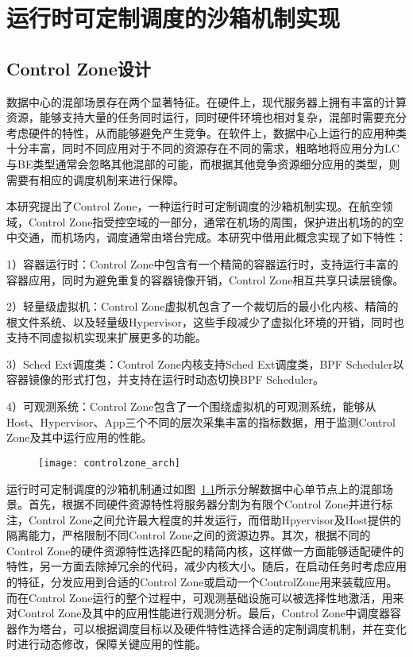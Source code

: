 \chapter{运行时可定制调度的沙箱机制实现}\label{chap:control_zone}

\section{Control Zone设计}



数据中心的混部场景存在两个显著特征。在硬件上，现代服务器上拥有丰富的计算资源，能够支持大量的任务同时运行，同时硬件环境也相对复杂，混部时需要充分考虑硬件的特性，从而能够避免产生竞争。在软件上，数据中心上运行的应用种类十分丰富，同时不同应用对于不同的资源存在不同的需求，粗略地将应用分为LC与BE类型通常会忽略其他混部的可能，而根据其他竞争资源细分应用的类型，则需要有相应的调度机制来进行保障。

本研究提出了Control Zone，一种运行时可定制调度的沙箱机制实现。在航空领域，Control Zone指受控空域的一部分，通常在机场的周围，保护进出机场的的空中交通，而机场内，调度通常由塔台完成。本研究中借用此概念实现了如下特性：

1）容器运行时：Control Zone中包含有一个精简的容器运行时，支持运行丰富的容器应用，同时为避免重复的容器镜像开销，Control Zone相互共享只读层镜像。

2）轻量级虚拟机：Control Zone虚拟机包含了一个裁切后的最小化内核、精简的根文件系统、以及轻量级Hypervisor，这些手段减少了虚拟化环境的开销，同时也支持不同虚拟机实现来扩展更多的功能。

3）Sched Ext调度类：Control Zone内核支持Sched Ext调度类，BPF Scheduler以容器镜像的形式打包，并支持在运行时动态切换BPF Scheduler。

4）可观测系统：Control Zone包含了一个围绕虚拟机的可观测系统，能够从Host、Hypervisor、App三个不同的层次采集丰富的指标数据，用于监测Control Zone及其中运行应用的性能。

\begin{figure}[!htbp]
    \centering
    \texttt{[image: controlzone\_arch]}
    \label{fig:controlzone_arch}
\end{figure}
 
运行时可定制调度的沙箱机制通过如图~\ref{fig:controlzone_arch}所示分解数据中心单节点上的混部场景。首先，根据不同硬件资源特性将服务器分割为有限个Control Zone并进行标注，Control Zone之间允许最大程度的并发运行，而借助Hpyervisor及Host提供的隔离能力，严格限制不同Control Zone之间的资源边界。其次，根据不同的Control Zone的硬件资源特性选择匹配的精简内核，这样做一方面能够适配硬件的特性，另一方面去除掉冗余的代码，减少内核大小。随后，在启动任务时考虑应用的特征，分发应用到合适的Control Zone或启动一个ControlZone用来装载应用。而在Control Zone运行的整个过程中，可观测基础设施可以被选择性地激活，用来对Control Zone及其中的应用性能进行观测分析。最后，Control Zone中调度器容器作为塔台，可以根据调度目标以及硬件特性选择合适的定制调度机制，并在变化时进行动态修改，保障关键应用的性能。

